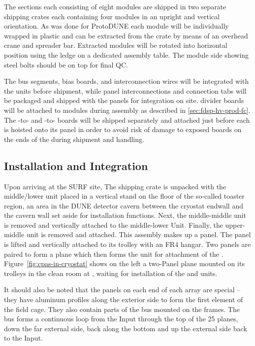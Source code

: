 The  sections each consisting of eight modules are shipped in two separate shipping crates each containing four modules in an upright and vertical orientation.
As was done for ProtoDUNE each  module will be individually wrapped in plastic 
and can be extracted from the crate by means of an overhead crane and spreader bar.
Extracted modules will be rotated into horizontal position using the ledge on a dedicated assembly table. The module side showing steel bolts should be on top for final QC. 


The  bus segments,  bias boards, and  interconnection wires will be integrated with the  units before shipment, while  panel interconnections and  connection tabs will be packaged and shipped with the  panels for integration on site.
 divider boards will be attached to  modules during  assembly as described in \ref{sec:fdsp-hv-prod-fc}.
The -to- and -to- boards will be shipped separately and attached just before each  is hoisted onto its  panel in order to avoid risk of damage to exposed boards on the ends of the  during shipment and handling.


\subsection{Installation and Integration}
\label{sec:fdsp-hv-integration}
Upon arriving at the SURF site, The  shipping crate is unpacked with the middle/lower  unit placed in a vertical stand on the floor of the so-called toaster region, an area in the DUNE detector cavern between the cryostat endwall and the cavern wall set aside for installation functions.  Next, the middle-middle  unit is removed and vertically attached to the middle-lower Unit.  Finally, the upper-middle  unit is removed and attached.  This assembly makes up a  panel.  The  panel is lifted and vertically attached to its trolley with an FR4 hangar.  Two  panels are paired to form a   plane which then forms the unit for attachment of the .  Figure~\ref{fig:cpas-in-cryostat} shows on the left a two-Panel  plane mounted on its trolleys in the clean room at , waiting for installation of the  and  units.

It should also be noted that the  panels on each end of each  array are special -- they have aluminum profiles along the exterior side to form the first element of the field cage.  They also contain parts of the  bus mounted on the  frames.  The  bus forms a continuous loop from the  Input through the top of the 25  planes, down the far external side, back along the bottom and up the  external side back to the  Input.

